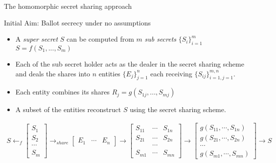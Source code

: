 \documentclass{beamer}
\begin{document}
\begin{frame}{The homomorphic secret sharing approach}
\begin{block}{}
Initial Aim: Ballot secrecy under no assumptions
\end{block}

\begin{itemize}
\item A \textit{super secret} $S$ can be computed from $m$ \textit{sub secrets} $\{ S_i \}_{i=1}^m$ $S = f(S_1,...,S_m)$
\item Each of the sub secret holder acts as the dealer in the secret sharing scheme and deals the shares into $n$ entities $ \{ E_j \}_{j=1}^n $ each receiving $ \{ S_{ij} \}_{i=1,j=1}^{m,n}$. 
\item Each entity combines its shares $R_j = g( S_{1j},...,S_{mj} )$ 
\item A subset of the entities reconstruct $S$ using the secret sharing scheme.
\end{itemize} 
\begin{tiny}
\begin{align*}
  S \leftarrow_{f}  
  \left[ \begin{array}{c} S_{1} \\ S_{2} \\ \cdots \\ S_{m} \end{array} \right]
  \rightarrow_{share} 
  \left[ \begin{array}{ccc} E_{1} &  \cdots & E_{n} \end{array} \right] 
  \rightarrow
  \left[ \begin{array}{ccc}  S_{11} & \cdots & S_{1n} \\ S_{21} & \cdots & S_{2n} \\ & \cdots & \\ S_{m1} & \cdots & S_{mn}   \end{array}  \right]
  \rightarrow
  \left[ \begin{array}{ccc}   g(S_{11}, \cdots, S_{1n}) \\ g(S_{21}, \cdots, S_{2n}) \\  \cdots  \\g(S_{m1}, \cdots, S_{mn})   \end{array} \right]
  \rightarrow
  S
\end{align*}
\end{tiny}
\end{frame}
\end{document}
